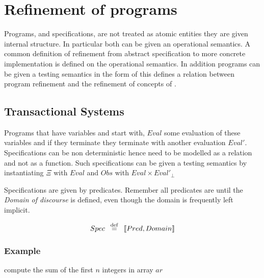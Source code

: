 \section{Refinement of programs}\label{sec:Prog}
Programs, and specifications, are not treated as atomic entities they are given internal structure. In particular both can be given an operational semantics. A common definition of refinement from abstract specification to more concrete implementation is defined on the operational semantics. In addition  programs can be given a testing semantics in the form of  this defines a relation between program refinement and the refinement of concepts  of .




\subsection{Transactional Systems}\label{sec:tran} Programs that have variables and start with, $Eval$ some evaluation of these variables and if they terminate they terminate  with another evaluation $Eval'$. Specifications can be non deterministic hence need to be  modelled as a relation and not as a function. Such specifications can be given a testing semantics by instantiating  $\Xi$ with  $Eval$  and $Obs$ with $Eval \times Eval'_{\bot}$

  Specifications are given by predicates. Remember  all predicates are until the \emph{Domain of discourse} is defined, even though the domain is frequently left implicit.

\[ Spec  \hspace*{0.5em} \stackrel{\mathrm{def}}{=} \hspace*{0.5em} \llbracket Pred, Domain \rrbracket \]


\subsubsection{Example} compute the sum of the first $n$ integers in array $ar$

